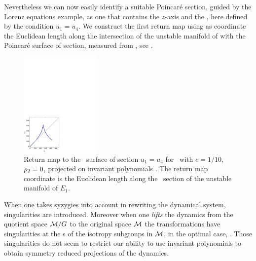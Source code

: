 Nevertheless we can now easily identify a suitable Poincar\'e
section, guided by the Lorenz equations example,
as one that contains the $z$-axis and
the \reqv, here defined by the condition $u_1=u_4$.
We
construct the first return map using as coordinate the
Euclidean length along the intersection of the unstable
manifold of  with the Poincar\'e surface of section,
measured from , see .


\begin{figure}[ht]
\begin{center}
\includegraphics[width=0.35\textwidth]{../figs/CLEipRM}
\end{center}
\caption[Return map for Complex Lorenz flow, invariant polynomials]
{Return map to the \Poincare\
surface of section $u_1=u_4$ for \CLe\ with $e=1/10$, $\rho_2=0$,
projected on invariant polynomials \refeq{eq:ipLaser}.
The return map coordinate is the Euclidean
length along the \Poincare\ section of the unstable manifold of $E_1$.
    }
\label{fig:CLEipRM}
\end{figure}


When one takes syzygies into account in rewriting the
dynamical system, singularities are introduced. Moreover when
one \emph{lifts} the dynamics from the quotient space
$\mathcal{M}/G$ to the original space $\mathcal{M}$ the transformations
have singularities at the \fixedsp s of
the isotropy subgroups in $\mathcal{M}$, in the optimal case, \cf
{}. Those singularities do not seem to
restrict our ability to use invariant polynomials to obtain
symmetry reduced projections of the dynamics.

